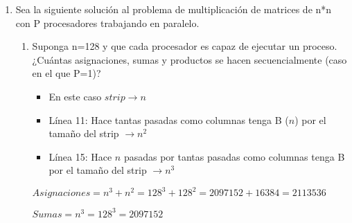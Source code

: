 \documentclass[a4paper, 10pt]{article}
\newenvironment{QandA}{
    \begin{enumerate}\bfseries}
    {\end{enumerate}
}
\newenvironment{answered}{\par\normalfont}{}
\begin{document}
\begin{QandA}
\begin{enumerate}
\item ¿Cuántos mensajes envía cada algoritmo para ordenar los valores? Justifique. NOTA: se pueden obviar en los cálculos los mensajes que se requieren para enviar los EOS.
\begin{answered}
\begin{itemize}
    \item Pipeline $\rightarrow$ Cada proceso envía 1 mensaje menos, del que recibió. De forma general, la cantidad total de mensajes puede verse como la siguiente sumatoria $\sum_{i=1}^n n-i$
    \item Sort Merged Network $\rightarrow$ Cada nivel del árbol envía $n$ mensajes, sabiendo que la altura del árbol es $log_2 n$ podemos afirmar que se enviarán $n * log_2 n$ mensajes.
\end{itemize}
\end{answered}
\item ¿En cada caso, cuáles mensajes pueden ser enviados en paralelo (asumiendo que existe el hardware apropiado) y cuáles son enviados secuencialmente? Justifique.
\item ¿Cuál es el tiempo total de ejecución de cada algoritmo? Asuma que cada operación de comparación o de envío de mensaje toma una unidad de tiempo. Justifique.
\end{enumerate}

\item Sea la siguiente solución al problema de multiplicación de matrices de n*n con P procesadores trabajando en paralelo.

\begin{enumerate}
\item Suponga n=128 y que cada procesador es capaz de ejecutar un proceso. ¿Cuántas asignaciones, sumas y productos se hacen secuencialmente (caso en el que P=1)?
\begin{answered}
\begin{itemize}
    \item En este caso $strip \rightarrow n$
    \item Línea 11: Hace tantas pasadas como columnas tenga B ($n$) por el tamaño del strip $\rightarrow n^2$
    \item Línea 15: Hace $n$ pasadas por tantas pasadas como columnas tenga B por el tamaño del strip $\rightarrow n^3$
\end{itemize}

$Asignaciones = n^3 + n^2 = 128^3 + 128^2 = 2097152 + 16384 = 2113536$

$Sumas = n^3 = 128^3 = 2097152$


\end{answered}
\end{enumerate}
\end{QandA}
\end{document}
